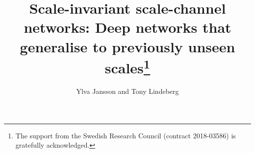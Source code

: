 \documentclass[twocolumn,runningheads]{svjour3}
\begin{document}
\title{\bf Scale-invariant scale-channel networks: Deep networks that
  generalise to previously unseen scales\thanks{The support from the Swedish Research Council 
              (contract 2018-03586) is gratefully acknowledged. }}
\author{Ylva Jansson and Tony Lindeberg }


\date{}

\maketitle
\end{document}
